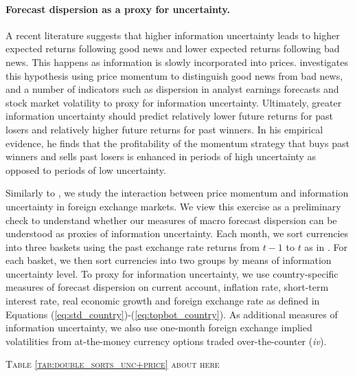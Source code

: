 \paragraph{Forecast dispersion as a proxy for uncertainty.}
A recent literature suggests that higher information uncertainty leads to higher expected returns following good news and lower expected returns following bad news. This happens as information is slowly incorporated into prices. \citet{zhang2006} investigates this hypothesis using price momentum to distinguish good news from bad news, and a number of indicators such as dispersion in analyst earnings forecasts and stock market volatility to proxy for information uncertainty. Ultimately, greater information uncertainty should predict relatively lower future returns for past losers and relatively higher future returns for past winners. In his empirical evidence, he finds that the profitability of the momentum strategy that buys past winners and sells past losers is enhanced in periods of high uncertainty as opposed to periods of low uncertainty.

Similarly to \citet{zhang2006}, we study the interaction between price momentum and information uncertainty in foreign exchange markets. We view this exercise as a preliminary check to understand whether our measures of macro forecast dispersion can be understood as proxies of information uncertainty. Each month, we sort currencies into three baskets using the past exchange rate returns from $t-1$ to $t$ as in \citet{menkhoff_etal2012b}. For each basket, we then sort currencies into two groups by means of information uncertainty level. To proxy for information uncertainty, we use country-specific measures of forecast dispersion on current account, inflation rate, short-term interest rate, real economic growth and foreign exchange rate as defined in Equations (\ref{eq:std_country})-(\ref{eq:topbot_country}). As additional measures of information uncertainty, we also use one-month foreign exchange implied volatilities from at-the-money currency options traded over-the-counter (\emph{iv}).

\begin{center}
	\textsc{Table \ref{tab:double_sorts_unc+price} about here}
\end{center}

